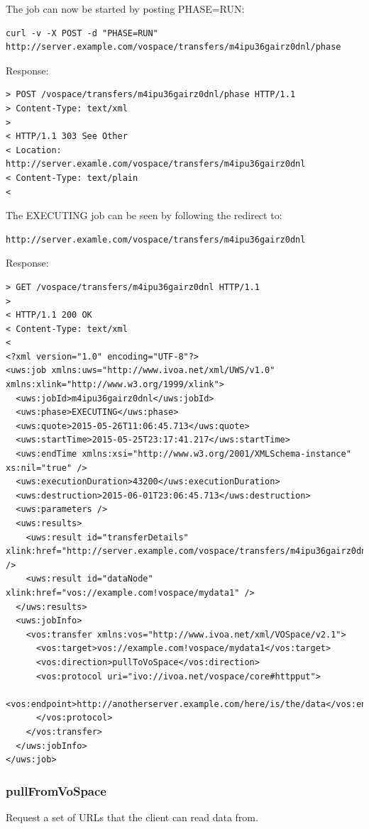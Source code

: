 \documentclass[11pt,a4paper]{ivoa}
\begin{document}
The job can now be started by posting PHASE=RUN:
\begin{lstlisting}
curl -v -X POST -d "PHASE=RUN" http://server.example.com/vospace/transfers/m4ipu36gairz0dnl/phase
\end{lstlisting}
Response:
\begin{lstlisting}
> POST /vospace/transfers/m4ipu36gairz0dnl/phase HTTP/1.1
> Content-Type: text/xml
>
< HTTP/1.1 303 See Other
< Location: http://server.examle.com/vospace/transfers/m4ipu36gairz0dnl
< Content-Type: text/plain
<
\end{lstlisting}
The EXECUTING job can be seen by following the redirect to:
\begin{lstlisting}
http://server.examle.com/vospace/transfers/m4ipu36gairz0dnl
\end{lstlisting}
Response:
\begin{lstlisting}
> GET /vospace/transfers/m4ipu36gairz0dnl HTTP/1.1
>
< HTTP/1.1 200 OK
< Content-Type: text/xml
<
<?xml version="1.0" encoding="UTF-8"?>
<uws:job xmlns:uws="http://www.ivoa.net/xml/UWS/v1.0" xmlns:xlink="http://www.w3.org/1999/xlink">
  <uws:jobId>m4ipu36gairz0dnl</uws:jobId>
  <uws:phase>EXECUTING</uws:phase>
  <uws:quote>2015-05-26T11:06:45.713</uws:quote>
  <uws:startTime>2015-05-25T23:17:41.217</uws:startTime>
  <uws:endTime xmlns:xsi="http://www.w3.org/2001/XMLSchema-instance" xs:nil="true" />
  <uws:executionDuration>43200</uws:executionDuration>
  <uws:destruction>2015-06-01T23:06:45.713</uws:destruction>
  <uws:parameters />
  <uws:results>
    <uws:result id="transferDetails" xlink:href="http://server.example.com/vospace/transfers/m4ipu36gairz0dnl/results/transferDetails" />
    <uws:result id="dataNode" xlink:href="vos://example.com!vospace/mydata1" />
  </uws:results>
  <uws:jobInfo>
    <vos:transfer xmlns:vos="http://www.ivoa.net/xml/VOSpace/v2.1">
      <vos:target>vos://example.com!vospace/mydata1</vos:target>
      <vos:direction>pullToVoSpace</vos:direction>
      <vos:protocol uri="ivo://ivoa.net/vospace/core#httpput">
        <vos:endpoint>http://anotherserver.example.com/here/is/the/data</vos:endpoint>
      </vos:protocol>
    </vos:transfer>
  </uws:jobInfo>
</uws:job>
\end{lstlisting}

\subsubsection{pullFromVoSpace}
\label{subsubsec:pullfromvospace}
Request a set of URLs that the client can read data from.
\end{document}
